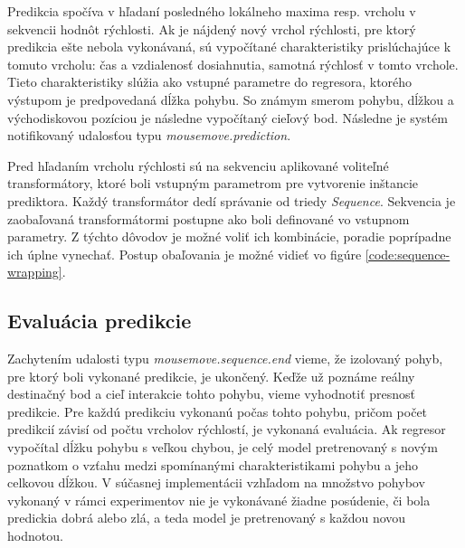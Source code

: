 Predikcia spočíva v hľadaní posledného lokálneho maxima resp. vrcholu v sekvencii hodnôt rýchlosti. Ak je nájdený nový vrchol rýchlosti, pre ktorý predikcia ešte nebola vykonávaná, sú vypočítané charakteristiky prislúchajúce k tomuto vrcholu: čas a vzdialenosť dosiahnutia, samotná rýchlosť v tomto vrchole. Tieto charakteristiky slúžia ako vstupné parametre do regresora, ktorého výstupom je predpovedaná dĺžka pohybu. So známym smerom pohybu, dĺžkou a východiskovou pozíciou je následne vypočítaný cieľový bod. Následne je systém notifikovaný udalosťou typu \emph{mousemove.prediction}.

Pred hľadaním vrcholu rýchlosti sú na sekvenciu aplikované voliteľné transformátory, ktoré boli vstupným parametrom pre vytvorenie inštancie prediktora. Každý transformátor dedí správanie od triedy \emph{Sequence}. Sekvencia je zaobaľovaná transformátormi postupne ako boli definované vo vstupnom parametry. Z týchto dôvodov je možné voliť ich kombinácie, poradie poprípadne ich úplne vynechať. Postup obaľovania je možné vidieť vo figúre \ref{code:sequence-wrapping}.

\subsection{Evaluácia predikcie}
Zachytením udalosti typu \emph{mousemove.sequence.end} vieme, že izolovaný pohyb, pre ktorý boli vykonané predikcie, je ukončený. Keďže už poznáme reálny destinačný bod a cieľ interakcie tohto pohybu, vieme vyhodnotiť presnosť predikcie. Pre každú predikciu vykonanú počas tohto pohybu, pričom počet predikcií závisí od počtu vrcholov rýchlostí, je vykonaná evaluácia. Ak regresor vypočítal dĺžku pohybu s veľkou chybou, je celý model pretrenovaný s novým poznatkom o vzťahu medzi spomínanými charakteristikami pohybu a jeho celkovou dĺžkou. V súčasnej implementácii vzhľadom na množstvo pohybov vykonaný v rámci experimentov nie je vykonávané žiadne posúdenie, či bola predickia dobrá alebo zlá, a teda model je pretrenovaný s každou novou hodnotou.
